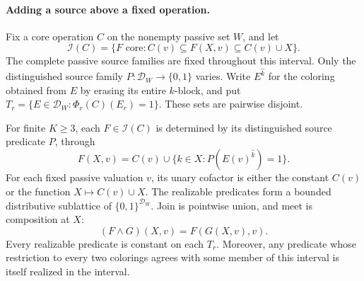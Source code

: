 \paragraph{Adding a source above a fixed operation.}
Fix a core operation $C$ on the nonempty passive set $W$, and let
\[
 \mathcal I(C)=\{F\text{ core}:C(v)\subseteq F(X,v)
                              \subseteq C(v)\cup X\}.
\]
The complete passive source families are fixed throughout this interval.
Only the distinguished source family $P:\mathcal D_W\to\{0,1\}$ varies.
Write $E^{\widehat k}$ for the coloring obtained from $E$ by erasing its
entire $k$-block, and put
$T_r=\{E\in\mathcal D_W:\Phi_r(C)(E_r)=1\}$.
These sets are pairwise disjoint.

\begin{theorem}
\label{core:thm:source-interval}
For finite $K\geq3$, each $F\in\mathcal I(C)$ is determined by its
distinguished source predicate $P$, through
\[
 F(X,v)=C(v)\cup
       \{k\in X:P(E(v)^{\widehat k})=1\}.
\]
For each fixed passive valuation $v$, its unary cofactor is either the
constant $C(v)$ or the function $X\mapsto C(v)\cup X$.
The realizable predicates form a bounded distributive sublattice of
$\{0,1\}^{\mathcal D_W}$. Join is pointwise union, and meet is
composition at $X$:
\[
 (F\wedge G)(X,v)=F(G(X,v),v).
\]
Every realizable predicate is constant on each $T_r$.
Moreover, any predicate whose restriction to every two colorings agrees
with some member of this interval is itself realized in the interval.
\end{theorem}
